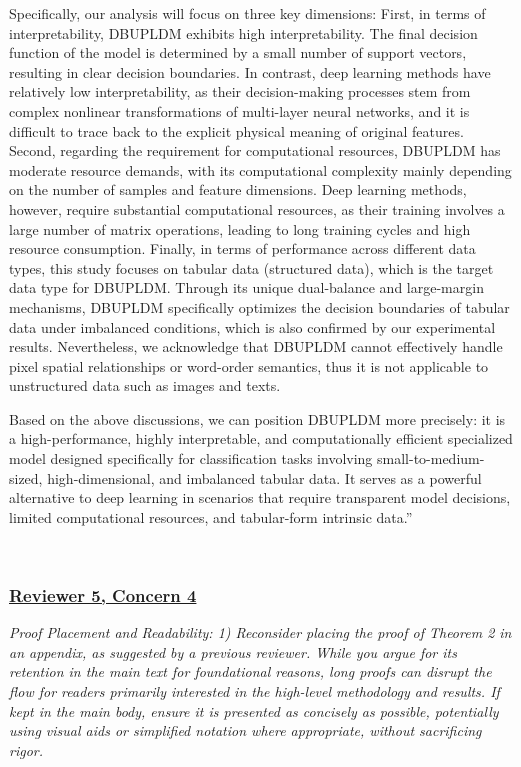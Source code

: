 \documentclass[journal,12pn, onecolumn]{IEEEtran}
\begin{document}
{{{{{{{Specifically, our analysis will focus on three key dimensions: First, in terms of interpretability, DBUPLDM exhibits high interpretability. The final decision function of the model is determined by a small number of support vectors, resulting in clear decision boundaries. In contrast, deep learning methods have relatively low interpretability, as their decision-making processes stem from complex nonlinear transformations of multi-layer neural networks, and it is difficult to trace back to the explicit physical meaning of original features. Second, regarding the requirement for computational resources, DBUPLDM has moderate resource demands, with its computational complexity mainly depending on the number of samples and feature dimensions. Deep learning methods, however, require substantial computational resources, as their training involves a large number of matrix operations, leading to long training cycles and high resource consumption. Finally, in terms of performance across different data types, this study focuses on tabular data (structured data), which is the target data type for DBUPLDM. Through its unique dual-balance and large-margin mechanisms, DBUPLDM specifically optimizes the decision boundaries of tabular data under imbalanced conditions, which is also confirmed by our experimental results. Nevertheless, we acknowledge that DBUPLDM cannot effectively handle pixel spatial relationships or word-order semantics, thus it is not applicable to unstructured data such as images and texts.

Based on the above discussions, we can position DBUPLDM more precisely: it is a high-performance, highly interpretable, and computationally efficient specialized model designed specifically for classification tasks involving small-to-medium-sized, high-dimensional, and imbalanced tabular data. It serves as a powerful alternative to deep learning in scenarios that require transparent model decisions, limited computational resources, and tabular-form intrinsic data.''}\\



\textcolor{customgreen}{
\subsubsection*{\underline{\textbf{Reviewer 5, Concern 4}}}
\emph{Proof Placement and Readability:
1) Reconsider placing the proof of Theorem 2 in an appendix, as suggested by a previous reviewer. While you argue for its retention in the main text for foundational reasons, long proofs can disrupt the flow for readers primarily interested in the high-level methodology and results. If kept in the main body, ensure it is presented as concisely as possible, potentially using visual aids or simplified notation where appropriate, without sacrificing rigor.
}}\\
{\color{black}
}}}}}}}
\end{document}

